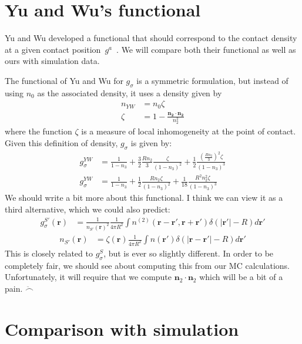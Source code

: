 \documentclass[letterpaper,twocolumn,amsmath,amssymb,jcp,10pt,aip]{revtex4-1}
\newcommand{\rr}{\textbf{r}}
\begin{document}
\section{Yu and Wu's functional}\label{sec:yuwu}

Yu and Wu developed a functional that should correspond to the contact
density at a given contact
position~$g^a$~\cite{yu2002fmt-dft-inhomogeneous-associating}.  We will
compare both their functional as well as ours with simulation data.

The functional of Yu and Wu for $g_\sigma$ is a symmetric formulation,
but instead of using $n_0$ as the associated density, it uses a
density given by
\begin{align}
  n_{YW} &= n_0 \zeta \\
  \zeta &= 1 - \frac{\mathbf{n_2}\cdot\mathbf{n_2}}{n_2^2}
\end{align}
where the function $\zeta$ is a measure of local inhomogeneity at the
point of contact.  Given this definition of density, $g_\sigma$ is
given by:
\begin{align}
  g_\sigma^{YW} &= \frac{1}{1-n_3}
    + \frac32 \frac{R n_2}{3}\frac{\zeta}{(1-n_3)^2}
    + \frac12 \frac{\left(\frac{R n_2}{3}\right)^2 \zeta}{(1-n_3)^3}
    \\
  g_\sigma^{YW} &= \frac{1}{1-n_3}
    + \frac12 \frac{R n_2\zeta}{(1-n_3)^2}
    + \frac1{18} \frac{R^2 n_2^2 \zeta}{(1-n_3)^3}
\end{align}
We should write a bit more about this functional.  I think we can view
it as a third alternative, which we could also predict:
\begin{align}
  g_\sigma^{S'}(\rr) &= \frac1{n_{S'}(\rr)^2}\frac1{4\pi R^2}\int n^{(2)}(\rr - \rr', \rr + \rr')\delta(|\rr'| -
  R)d\rr'
\end{align}
\begin{align}
  n_{S'}(\rr) &= \zeta(\rr) \frac{1}{4\pi R^2}\int n(\rr')\delta(|\rr-\rr'|-R) d\rr'
\end{align}
This is closely related to $g_\sigma^{S}$, but is ever so slightly
different.  In order to be completely fair, we should see about
computing this from our MC calculations.  Unfortunately, it will
require that we compute $\mathbf{n}_2 \cdot \mathbf{n}_2$ which will
be a bit of a pain.  $\ddot\frown$

\section{Comparison with simulation}
\end{document}
